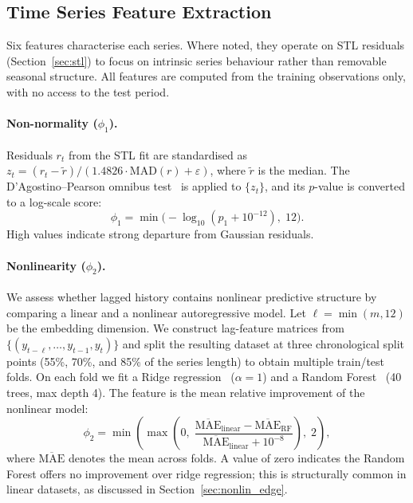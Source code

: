 \documentclass[pdflatex,sn-mathphys-num]{sn-jnl}
\theoremstyle{thmstyleone}
\theoremstyle{thmstyletwo}
\theoremstyle{thmstylethree}
\begin{document}
\subsection{Time Series Feature Extraction}\label{sec:features}

Six features characterise each series.
Where noted, they operate on STL residuals (Section~\ref{sec:stl}) to
focus on intrinsic series behaviour rather than removable seasonal structure.
All features are computed from the training observations only, with no access
to the test period.

\paragraph{Non-normality ($\phi_1$).}
Residuals $r_t$ from the STL fit are standardised as
$z_t = (r_t - \tilde{r}) / (1.4826 \cdot \mathrm{MAD}(r) + \varepsilon)$,
where $\tilde{r}$ is the median.
The D'Agostino--Pearson omnibus test~\cite{dagostino1971} is applied to
$\{z_t\}$, and its $p$-value is converted to a log-scale score:
\begin{equation}
  \phi_1 = \min\!\bigl(-\log_{10}(p_1 + 10^{-12}),\; 12\bigr).
  \label{eq:phi1}
\end{equation}
High values indicate strong departure from Gaussian residuals.

\paragraph{Nonlinearity ($\phi_2$).}
We assess whether lagged history contains nonlinear predictive structure by
comparing a linear and a nonlinear autoregressive model.
Let $\ell = \min(m, 12)$ be the embedding dimension.
We construct lag-feature matrices from $\{(y_{t-\ell},\ldots,y_{t-1}, y_t)\}$
and split the resulting dataset at three chronological split points
(55\%, 70\%, and 85\% of the series length) to obtain multiple train/test folds.
On each fold we fit a Ridge regression~\cite{hoerl1970ridge} ($\alpha = 1$) and
a Random Forest~\cite{breiman2001random} (40 trees, max depth 4).
The feature is the mean relative improvement of the nonlinear model:
\begin{equation}
  \phi_2 = \min\!\left(
    \max\!\left(0,\;
    \frac{\overline{\mathrm{MAE}}_{\mathrm{linear}} -
           \overline{\mathrm{MAE}}_{\mathrm{RF}}}
         {\overline{\mathrm{MAE}}_{\mathrm{linear}} + 10^{-8}}
    \right),\; 2
  \right),
  \label{eq:phi2}
\end{equation}
where $\overline{\mathrm{MAE}}$ denotes the mean across folds.
A value of zero indicates the Random Forest offers no improvement over ridge
regression; this is structurally common in linear datasets, as discussed in
Section~\ref{sec:nonlin_edge}.
\end{document}
